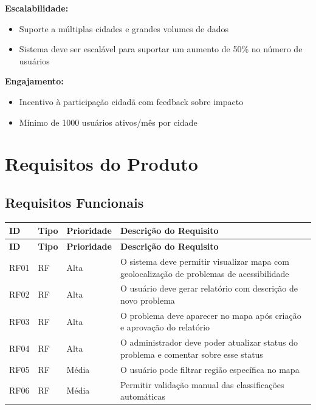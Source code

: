 \documentclass[12pt,a4paper]{article}
\begin{document}
\textbf{Escalabilidade:}
\begin{itemize}
    \item Suporte a múltiplas cidades e grandes volumes de dados
    \item Sistema deve ser escalável para suportar um aumento de 50\% no número de usuários
\end{itemize}

\textbf{Engajamento:}
\begin{itemize}
    \item Incentivo à participação cidadã com feedback sobre impacto
    \item Mínimo de 1000 usuários ativos/mês por cidade
\end{itemize}

\section{Requisitos do Produto}
\label{sec:requisitos}

\subsection{Requisitos Funcionais}

\begin{longtable}{|>{\raggedright\arraybackslash}p{1.2cm}|>{\raggedright\arraybackslash}p{1.1cm}|>{\centering\arraybackslash}p{2.2cm}|>{\raggedright\arraybackslash}p{7.6cm}|}
\hline
\textbf{ID} & \textbf{Tipo} & \textbf{Prioridade} & \textbf{Descrição do Requisito} \\
\hline
\endfirsthead

\hline
\textbf{ID} & \textbf{Tipo} & \textbf{Prioridade} & \textbf{Descrição do Requisito} \\
\hline
\endhead

RF01 & RF & Alta & O sistema deve permitir visualizar mapa com geolocalização de problemas de acessibilidade \\
\hline
RF02 & RF & Alta & O usuário deve gerar relatório com descrição de novo problema \\
\hline
RF03 & RF & Alta & O problema deve aparecer no mapa após criação e aprovação do relatório \\
\hline
RF04 & RF & Alta & O administrador deve poder atualizar status do problema e comentar sobre esse status \\
\hline
RF05 & RF & Média & O usuário pode filtrar região específica no mapa \\
\hline
RF06 & RF & Média & Permitir validação manual das classificações automáticas \\
\hline
\end{longtable}
\end{document}
